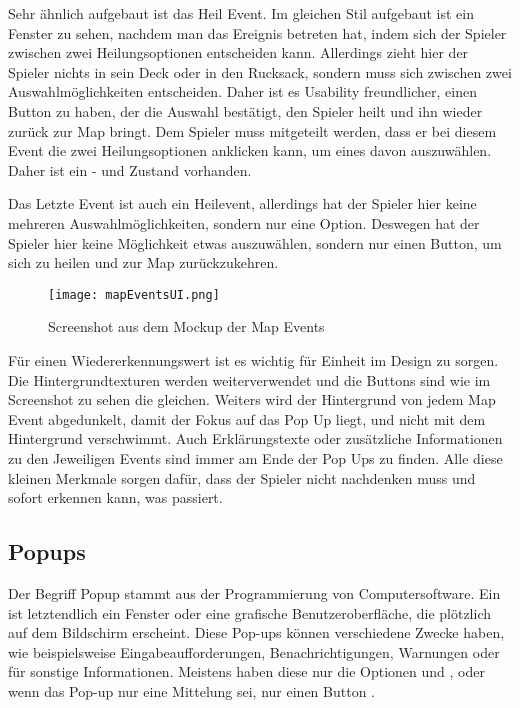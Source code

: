 Sehr ähnlich aufgebaut ist das Heil Event. Im gleichen Stil aufgebaut ist ein Fenster zu sehen, nachdem man das Ereignis betreten hat, indem sich der Spieler zwischen zwei Heilungsoptionen entscheiden kann. Allerdings zieht hier der Spieler nichts in sein Deck oder in den Rucksack, sondern muss sich zwischen zwei Auswahlmöglichkeiten entscheiden. Daher ist es Usability freundlicher, einen Button zu haben, der die Auswahl bestätigt, den Spieler heilt und ihn wieder zurück zur Map bringt. Dem Spieler muss mitgeteilt werden, dass er bei diesem Event die zwei Heilungsoptionen anklicken kann, um eines davon auszuwählen. Daher ist ein
- und  Zustand vorhanden.

Das Letzte Event ist auch ein Heilevent, allerdings hat der Spieler hier keine mehreren Auswahlmöglichkeiten, sondern nur eine Option. Deswegen hat der Spieler hier keine Möglichkeit etwas auszuwählen, sondern nur einen Button, um sich zu heilen und zur Map zurückzukehren.

\begin{figure}[H]
    \centering
    \texttt{[image: mapEventsUI.png]}
    \caption{Screenshot aus dem Mockup der Map Events}
\end{figure}

Für einen Wiedererkennungswert ist es wichtig für Einheit im Design zu sorgen. Die Hintergrundtexturen werden weiterverwendet und die Buttons sind wie im Screenshot zu sehen die gleichen. Weiters wird der Hintergrund von jedem Map Event abgedunkelt, damit der Fokus auf das Pop Up liegt, und nicht mit dem Hintergrund verschwimmt. Auch Erklärungstexte oder zusätzliche Informationen zu den Jeweiligen Events sind immer am Ende der Pop Ups zu finden. Alle diese kleinen Merkmale sorgen dafür, dass der Spieler nicht nachdenken muss und sofort erkennen kann, was passiert.

\subsection{Popups}

Der Begriff Popup stammt aus der Programmierung von Computersoftware. Ein  ist letztendlich ein Fenster oder eine grafische Benutzeroberfläche, die plötzlich auf dem Bildschirm erscheint. Diese Pop-ups können verschiedene Zwecke haben, wie beispielsweise Eingabeaufforderungen, Benachrichtigungen, Warnungen oder für sonstige Informationen. Meistens haben diese nur die Optionen
 und ,
oder wenn das Pop-up nur eine Mittelung sei, nur einen
 Button .

